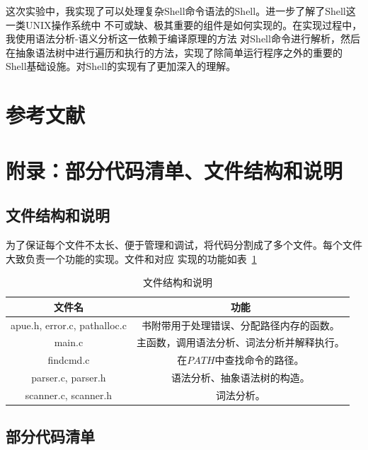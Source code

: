 \documentclass[a4paper,twoside]{article}
\begin{document}
\begin{spacing}{1.2}
这次实验中，我实现了可以处理复杂Shell命令语法的Shell。进一步了解了Shell这一类UNIX操作系统中
不可或缺、极其重要的组件是如何实现的。在实现过程中，我使用语法分析-语义分析这一依赖于编译原理的方法
对Shell命令进行解析，然后在抽象语法树中进行遍历和执行的方法，实现了除简单运行程序之外的重要的
Shell基础设施。对Shell的实现有了更加深入的理解。

\appendix

\clearpage
\section*{参考文献}




\clearpage
\section*{附录：部分代码清单、文件结构和说明}
\label{sec:code}


\subsection{文件结构和说明}

为了保证每个文件不太长、便于管理和调试，将代码分割成了多个文件。每个文件大致负责一个功能的实现。文件和对应
实现的功能如表~\ref{tbl:file}

\begin{table}[htb]
	\centering
	\linespread{1.5}
	\caption{文件结构和说明}
	\label{tbl:file}
	\begin{tabular}{c|c}
		\toprule
		\hline
		文件名 & 功能 \\
		\hline
		apue.h, error.c, pathalloc.c & 书附带用于处理错误、分配路径内存的函数。 \\
		\hline
		main.c & 主函数，调用语法分析、词法分析并解释执行。 \\
		\hline
		findcmd.c & 在$PATH$中查找命令的路径。 \\
		\hline
		parser.c, parser.h & 语法分析、抽象语法树的构造。 \\
		\hline
		scanner.c, scanner.h & 词法分析。 \\
		\hline
		\bottomrule
	\end{tabular}
\end{table}

\subsection{部分代码清单}


\end{spacing}
\end{document}
